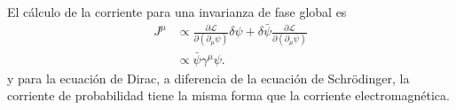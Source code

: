 El c\'alculo de la corriente para una invarianza de fase global es
\begin{align}
  J^\mu&\propto\frac{\partial\mathcal{L}}{\partial\left(\partial_\mu\psi\right)}\delta\psi+\delta\bar{\psi}\frac{\partial\mathcal{L}}{\partial\left(\partial_\mu\bar{\psi}\right)}\nonumber\\
  &\propto \bar{\psi}\gamma^\mu\psi.
\end{align}
y para la ecuaci\'on de Dirac, a diferencia de la ecuaci\'on de Schr\"odinger, la corriente de probabilidad tiene la misma forma que la corriente electromagn\'etica.


